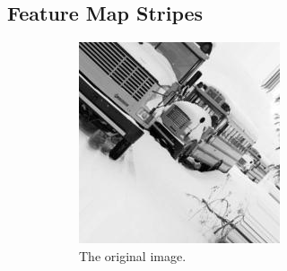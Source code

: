 \subsection{Feature Map Stripes}\label{subsec:feature-map-stripes}

\begin{figure}
    \centering
    \begin{subfigure}{0.3\textwidth}
        \centering
        \includegraphics[width=\textwidth]{images/stripes/original.jpg}
        \caption{The original image.}
        \label{subfig:stripes_original}
    \end{subfigure}
    \hfill
    \begin{subfigure}{0.3\textwidth}
        \centering

\end{subfigure}
\end{figure}
